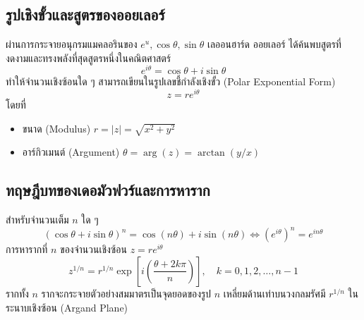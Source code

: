 \subsection{รูปเชิงขั้วและสูตรของออยเลอร์}
ผ่านการกระจายอนุกรมแมคลอรินของ $e^u, \cos\theta, \sin\theta$ เลออนฮาร์ด ออยเลอร์ ได้ค้นพบสูตรที่งดงามและทรงพลังที่สุดสูตรหนึ่งในคณิตศาสตร์
\begin{equation}
e^{i\theta} = \cos\theta + i\sin\theta
\end{equation}
ทำให้จำนวนเชิงซ้อนใด ๆ สามารถเขียนในรูปเลขชี้กำลังเชิงขั้ว (Polar Exponential Form)
\begin{equation}
z = r e^{i\theta}
\end{equation}
โดยที่
\begin{itemize}
    \item ขนาด (Modulus) $r = |z| = \sqrt{x^2 + y^2}$
    \item อาร์กิวเมนต์ (Argument) $\theta = \arg(z) = \arctan(y/x)$
\end{itemize}

\subsection{ทฤษฎีบทของเดอมัวฟวร์และการหาราก}
สำหรับจำนวนเต็ม $n$ ใด ๆ
\begin{equation}
(\cos\theta + i\sin\theta)^n = \cos(n\theta) + i\sin(n\theta) \iff (e^{i\theta})^n = e^{in\theta}
\end{equation}
การหารากที่ $n$ ของจำนวนเชิงซ้อน $z = r e^{i\theta}$
\begin{equation}
z^{1/n} = r^{1/n} \exp\left[i\left(\frac{\theta + 2k\pi}{n}\right)\right], \quad k = 0, 1, 2, \dots, n-1
\end{equation}
รากทั้ง $n$ รากจะกระจายตัวอย่างสมมาตรเป็นจุดยอดของรูป $n$ เหลี่ยมด้านเท่าบนวงกลมรัศมี $r^{1/n}$ ในระนาบเชิงซ้อน (Argand Plane)

